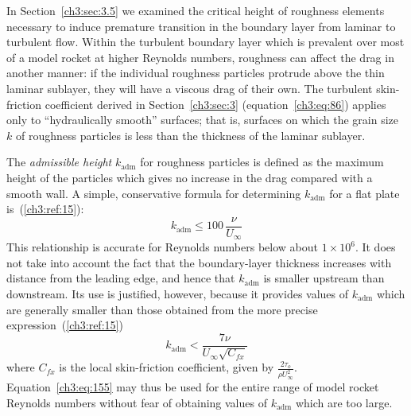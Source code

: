 In Section~\ref{ch3:sec:3.5} we examined the critical height of roughness elements necessary to
induce premature transition in the boundary layer from laminar to turbulent flow. Within the
turbulent boundary layer which is prevalent over most of a model rocket at higher Reynolds numbers,
roughness can affect the drag in another manner: if the individual roughness particles protrude
above the thin laminar sublayer, they will have a viscous drag of their own. The turbulent
skin-friction coefficient derived in Section~\ref{ch3:sec:3} (equation~\eqref{ch3:eq:86}) applies
only to ``hydraulically smooth'' surfaces; that is, surfaces on which the grain size $k$ of
roughness particles is less than the thickness of the laminar sublayer.

The \emph{admissible height} $k_{\mathrm{adm}}$ for roughness particles is defined as the maximum
height of the particles which gives no increase in the drag compared with a smooth wall. A simple,
conservative formula for determining $k_{\mathrm{adm}}$ for a flat plate is~(\ref{ch3:ref:15}):
\begin{equation}\label{ch3:eq:155}
k_{\mathrm{adm}} \le 100\,\frac{\nu}{U_\infty}
\end{equation}
This relationship is accurate for Reynolds numbers below about $1 \times 10^{6}$. It does not take
into account the fact that the boundary-layer thickness increases with distance from the leading
edge, and hence that $k_{\mathrm{adm}}$ is smaller upstream than downstream. Its use is justified,
however, because it provides values of $k_{\mathrm{adm}}$ which are generally smaller than those
obtained from the more precise expression~(\ref{ch3:ref:15})
\begin{equation}\label{ch3:eq:156}
k_{\mathrm{adm}} < \frac{7\nu}{U_\infty\sqrt{C_{fx}}}
\end{equation}
where $C_{fx}$ is the local skin-friction coefficient, given by
$\frac{2\tau_o}{\rho U_\infty^2}$. Equation~\eqref{ch3:eq:155} may thus be used for the entire
range of model rocket Reynolds numbers without fear of obtaining values of $k_{\mathrm{adm}}$ which
are too large.

